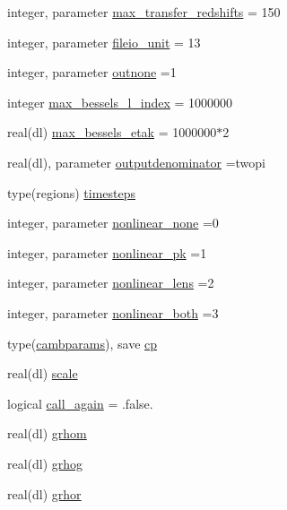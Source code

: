 \begin{DoxyCompactItemize}
integer, parameter \mbox{\hyperlink{namespacemodelparams_abe7b8d46cfb994afa85d77bbb5b6b5d5}{max\+\_\+transfer\+\_\+redshifts}} = 150
\item 
integer, parameter \mbox{\hyperlink{namespacemodelparams_ac3257ef5df85ecef99f684ac5b101b71}{fileio\+\_\+unit}} = 13
\item 
integer, parameter \mbox{\hyperlink{namespacemodelparams_a08fb4afbafc2828da55e9684f24d8d6f}{outnone}} =1
\item 
integer \mbox{\hyperlink{namespacemodelparams_a0398b22cb85696d3eeaf76b7db97215c}{max\+\_\+bessels\+\_\+l\+\_\+index}} = 1000000
\item 
real(dl) \mbox{\hyperlink{namespacemodelparams_a7a677586a4085c9c337cac0d8a025dc6}{max\+\_\+bessels\+\_\+etak}} = 1000000$\ast$2
\item 
real(dl), parameter \mbox{\hyperlink{namespacemodelparams_abb77cb9ffb6e4c47f4bbb5817f675840}{outputdenominator}} =twopi
\item 
type(regions) \mbox{\hyperlink{namespacemodelparams_ab62c122a08bce8a2c161066a3e0f83cd}{timesteps}}
\item 
integer, parameter \mbox{\hyperlink{namespacemodelparams_a2e14a764fa10ffaa74cc53471510c99b}{nonlinear\+\_\+none}} =0
\item 
integer, parameter \mbox{\hyperlink{namespacemodelparams_a7534d8ae818c3b810559177c3108c43c}{nonlinear\+\_\+pk}} =1
\item 
integer, parameter \mbox{\hyperlink{namespacemodelparams_a0f2c57977e2bc614225a5776fbcd1efa}{nonlinear\+\_\+lens}} =2
\item 
integer, parameter \mbox{\hyperlink{namespacemodelparams_a44142a84e66f3bd7d9feebe2abd22160}{nonlinear\+\_\+both}} =3
\item 
type(\mbox{\hyperlink{structmodelparams_1_1cambparams}{cambparams}}), save \mbox{\hyperlink{namespacemodelparams_a957df29b9a56a2cfc2a8cb27d46daa2d}{cp}}
\item 
real(dl) \mbox{\hyperlink{namespacemodelparams_adc3b09efaf8a6d37303ccd19e27ae6e3}{scale}}
\item 
logical \mbox{\hyperlink{namespacemodelparams_a188f571d5f56be7a62bb3079ef44c3ce}{call\+\_\+again}} = .false.
\item 
real(dl) \mbox{\hyperlink{namespacemodelparams_a2ef8c57ec3ca12626295c0af7c8891b9}{grhom}}
\item 
real(dl) \mbox{\hyperlink{namespacemodelparams_adcca33df63a9b35b19c2f220028498b1}{grhog}}
\item 
real(dl) \mbox{\hyperlink{namespacemodelparams_aad31721fc53cb058072f19818ffd7178}{grhor}}

\end{DoxyCompactItemize}
